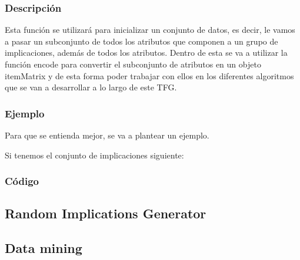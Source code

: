 
\subsubsection{Descripci\'on}

Esta funci\'on se utilizar\'a para inicializar un conjunto de datos, es decir, le vamos a pasar un subconjunto 
de todos los atributos que componen a un grupo de implicaciones, adem\'as de todos los atributos. Dentro de esta 
se va a utilizar la funci\'on encode para convertir el subconjunto de atributos en un objeto itemMatrix y de esta 
forma poder trabajar con ellos en los diferentes algoritmos que se van a desarrollar a lo largo de este TFG.


\subsubsection{Ejemplo}
Para que se entienda mejor, se va a plantear un ejemplo. 

Si tenemos el conjunto de implicaciones siguiente: 



\subsubsection{C\'odigo}














\clearpage

\subsection{Random Implications Generator}



\clearpage

\subsection{Data mining}




\clearpage



\newpage
\thispagestyle{empty}
\mbox{}

\newpage